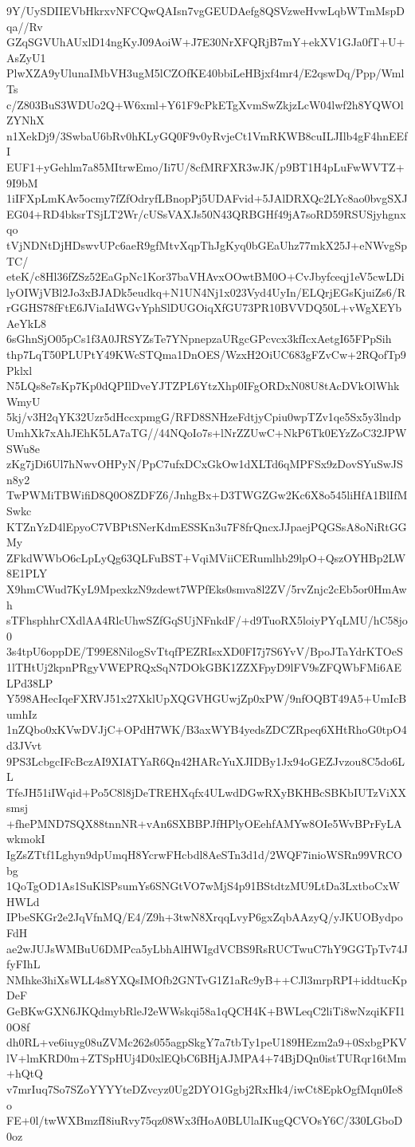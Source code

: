 9Y/UySDIIEVbHkrxvNFCQwQAIsn7vgGEUDAefg8QSVzweHvwLqbWTmMspDqa//Rv
GZqSGVUhAUxlD14ngKyJ09AoiW+J7E30NrXFQRjB7mY+ekXV1GJa0fT+U+AsZyU1
PlwXZA9yUlunaIMbVH3ugM5lCZOfKE40bbiLeHBjxf4mr4/E2qswDq/Ppp/WmlTs
c/Z803BuS3WDUo2Q+W6xml+Y61F9cPkETgXvmSwZkjzLcW04lwf2h8YQWOlZYNhX
n1XekDj9/3SwbaU6bRv0hKLyGQ0F9v0yRvjeCt1VmRKWB8cuILJIlb4gF4hnEEfI
EUF1+yGehlm7a85MItrwEmo/Ii7U/8cfMRFXR3wJK/p9BT1H4pLuFwWVTZ+9I9bM
1iIFXpLmKAv5ocmy7fZfOdryfLBnopPj5UDAFvid+5JAlDRXQc2LYc8ao0bvgSXJ
EG04+RD4bksrTSjLT2Wr/cUSsVAXJs50N43QRBGHf49jA7soRD59RSUSjyhgnxqo
tVjNDNtDjHDswvUPc6aeR9gfMtvXqpThJgKyq0bGEaUhz77mkX25J+eNWvgSpTC/
eteK/c8Hl36fZSz52EaGpNc1Kor37baVHAvxOOwtBM0O+CvJbyfceqj1eV5cwLDi
lyOIWjVBl2Jo3xBJADk5eudkq+N1UN4Nj1x023Vyd4UyIn/ELQrjEGsKjuiZs6/R
rGGHS78fFtE6JViaIdWGvYphSlDUGOiqXfGU73PR10BVVDQ50L+vWgXEYbAeYkL8
6sGhnSjO05pCs1f3A0JRSYZsTe7YNpnepzaURgcGPcvcx3kfIcxAetgI65FPpSih
thp7LqT50PLUPtY49KWcSTQma1DnOES/WzxH2OiUC683gFZvCw+2RQofTp9Pklxl
N5LQs8e7sKp7Kp0dQPIlDveYJTZPL6YtzXhp0IFgORDxN08U8tAcDVkOlWhkWmyU
5kj/v3H2qYK32Uzr5dHccxpmgG/RFD8SNHzeFdtjyCpiu0wpTZv1qe5Sx5y3lndp
UmhXk7xAhJEhK5LA7aTG//44NQoIo7s+lNrZZUwC+NkP6Tk0EYzZoC32JPWSWu8e
zKg7jDi6Ul7hNwvOHPyN/PpC7ufxDCxGkOw1dXLTd6qMPFSx9zDovSYuSwJSn8y2
TwPWMiTBWifiD8Q0O8ZDFZ6/JnhgBx+D3TWGZGw2Kc6X8o545liHfA1BlIfMSwkc
KTZnYzD4lEpyoC7VBPtSNerKdmESSKn3u7F8frQncxJJpaejPQGSsA8oNiRtGGMy
ZFkdWWbO6cLpLyQg63QLFuBST+VqiMViiCERumlhb29lpO+QszOYHBp2LW8E1PLY
X9hmCWud7KyL9MpexkzN9zdewt7WPfEks0smva8l2ZV/5rvZnjc2cEb5or0HmAwh
sTFhsphhrCXdlAA4RlcUhwSZfGqSUjNFnkdF/+d9TuoRX5loiyPYqLMU/hC58jo0
3s4tpU6oppDE/T99E8NilogSvTtqfPEZRIsxXD0FI7j7S6YvV/BpoJTaYdrKTOeS
1lTHtUj2kpnPRgyVWEPRQxSqN7DOkGBK1ZZXFpyD9lFV9sZFQWbFMi6AELPd38LP
Y598AHecIqeFXRVJ51x27XklUpXQGVHGUwjZp0xPW/9nfOQBT49A5+UmIcBumhIz
1nZQbo0xKVwDVJjC+OPdH7WK/B3axWYB4yedsZDCZRpeq6XHtRhoG0tpO4d3JVvt
9PS3LcbgcIFcBczAI9XIATYaR6Qn42HARcYuXJIDBy1Jx94oGEZJvzou8C5do6LL
TfeJH51iIWqid+Po5C8l8jDeTREHXqfx4ULwdDGwRXyBKHBcSBKbIUTzViXXsmsj
+fhePMND7SQX88tnnNR+vAn6SXBBPJfHPlyOEehfAMYw8OIe5WvBPrFyLAwkmokI
IgZsZTtf1Lghyn9dpUmqH8YcrwFHcbdl8AeSTn3d1d/2WQF7inioWSRn99VRCObg
1QoTgOD1As1SuKlSPsumYs6SNGtVO7wMjS4p91BStdtzMU9LtDa3LxtboCxWHWLd
IPbeSKGr2e2JqVfnMQ/E4/Z9h+3twN8XrqqLvyP6gxZqbAAzyQ/yJKUOBydpoFdH
ae2wJUJsWMBuU6DMPca5yLbhAlHWIgdVCBS9RsRUCTwuC7hY9GGTpTv74JfyFIhL
NMhke3hiXsWLL4s8YXQsIMOfb2GNTvG1Z1aRc9yB++CJl3mrpRPI+iddtucKpDeF
GeBKwGXN6JKQdmybRleJ2eWWskqi58a1qQCH4K+BWLeqC2liTi8wNzqiKFI10O8f
dh0RL+ve6iuyg08uZVMc262s055agpSkgY7a7tbTy1peU189HEzm2a9+0SxbgPKV
lV+lmKRD0m+ZTSpHUj4D0xlEQbC6BHjAJMPA4+74BjDQn0istTURqr16tMm+hQtQ
v7mrIuq7So7SZoYYYYteDZvcyz0Ug2DYO1Ggbj2RxHk4/iwCt8EpkOgfMqn0Ie8o
FE+0l/twWXBmzfI8iuRvy75qz08Wx3fHoA0BLUlaIKugQCVOsY6C/330LGboD0oz
